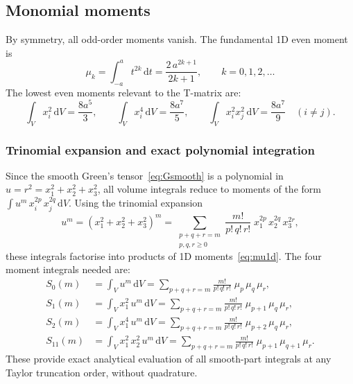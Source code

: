 \documentclass[11pt,a4paper]{article}
\newcommand{\dd}{\mathrm{d}}
\begin{document}
\subsection{Monomial moments}

By symmetry, all odd-order moments vanish. The fundamental 1D even
moment is
\begin{equation}
  \mu_k = \int_{-a}^{a} t^{2k}\,\dd t = \frac{2\,a^{2k+1}}{2k+1},
  \qquad k = 0, 1, 2, \ldots
  \label{eq:mu1d}
\end{equation}
The lowest even moments relevant to the T-matrix are:
\begin{equation}
  \int_V x_i^2 \,\dd V = \frac{8a^5}{3},
  \qquad
  \int_V x_i^4 \,\dd V = \frac{8a^7}{5},
  \qquad
  \int_V x_i^2 x_j^2 \,\dd V = \frac{8a^7}{9}
  \quad (i \neq j).
  \label{eq:moments}
\end{equation}

\subsubsection{Trinomial expansion and exact polynomial integration}

Since the smooth Green's tensor~\eqref{eq:Gsmooth} is a polynomial
in $u = r^2 = x_1^2 + x_2^2 + x_3^2$, all volume integrals reduce
to moments of the form $\int u^m\,x_i^{2p}\,x_j^{2q}\,\dd V$.
Using the trinomial expansion
\begin{equation}
  u^m = (x_1^2 + x_2^2 + x_3^2)^m
  = \sum_{\substack{p+q+r=m \\ p,q,r \geq 0}}
    \frac{m!}{p!\,q!\,r!}\;
    x_1^{2p}\,x_2^{2q}\,x_3^{2r},
  \label{eq:trinomial}
\end{equation}
these integrals factorise into products of 1D
moments~\eqref{eq:mu1d}. The four moment integrals needed are:
\begin{align}
  S_0(m) &= \int_V u^m\,\dd V
  = \sum_{p+q+r=m}
    \frac{m!}{p!\,q!\,r!}\;\mu_p\,\mu_q\,\mu_r,
  \label{eq:S0} \\
  S_1(m) &= \int_V x_1^2\,u^m\,\dd V
  = \sum_{p+q+r=m}
    \frac{m!}{p!\,q!\,r!}\;\mu_{p+1}\,\mu_q\,\mu_r,
  \label{eq:S1} \\
  S_2(m) &= \int_V x_1^4\,u^m\,\dd V
  = \sum_{p+q+r=m}
    \frac{m!}{p!\,q!\,r!}\;\mu_{p+2}\,\mu_q\,\mu_r,
  \label{eq:S2} \\
  S_{11}(m) &= \int_V x_1^2\,x_2^2\,u^m\,\dd V
  = \sum_{p+q+r=m}
    \frac{m!}{p!\,q!\,r!}\;\mu_{p+1}\,\mu_{q+1}\,\mu_r.
  \label{eq:S11}
\end{align}
These provide exact analytical evaluation of all smooth-part
integrals at any Taylor truncation order, without quadrature.
\end{document}
